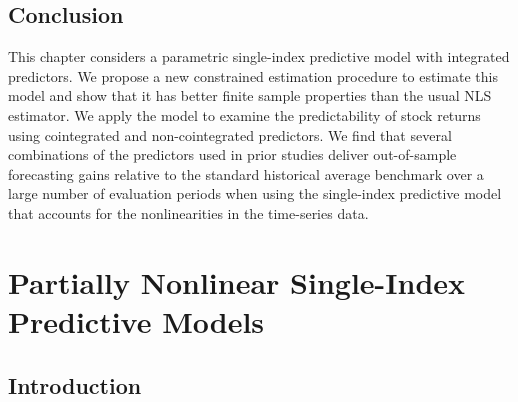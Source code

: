 \documentclass[a4paper,12pt,times,numbered,print,index]{report}
\numberwithin{equation}{section}
\begin{document}
	\section{Conclusion}
	This chapter considers a parametric single-index predictive model with integrated predictors. We propose a new constrained estimation procedure to estimate this model and show that it has better finite sample properties than the usual NLS estimator. We apply the model to examine the predictability of stock returns using cointegrated and non-cointegrated predictors. We find that several combinations of the predictors used in prior studies deliver out-of-sample forecasting gains relative to the standard historical average benchmark over a large number of evaluation periods when using the single-index predictive model that accounts for the nonlinearities in the time-series data. 
	
	\pagebreak
	
	
	\chapter{Partially Nonlinear Single-Index Predictive Models}
	
	\setcounter{section}{0}
	\section{Introduction}
	
\end{document}
